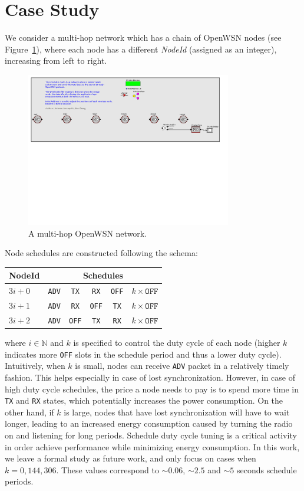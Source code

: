 \section{Case Study}
\label{sec:case-study}

We consider a multi-hop network which has a chain of OpenWSN nodes (see Figure~\ref{fig:multihop}), where each node has a different {\em NodeId} (assigned as an integer), increasing from left to right. 
\begin{figure}[t]
\centering
\includegraphics[width=0.8\textwidth]{figures/PaperDemoPtolemy}
\caption{\small A multi-hop OpenWSN network.}
\label{fig:multihop}
\end{figure}
Node schedules are constructed following the schema:

\begin{tabular}{ l | c | c | c | c | c }
  \hline                       
  NodeId & \multicolumn{5}{c}{Schedules} \\
  \hline
  $3i+0$ & \texttt{ADV} & \texttt{TX} & \texttt{RX} & \texttt{OFF} & $k \times \texttt{OFF}$ \\
  $3i+1$ & \texttt{ADV} & \texttt{RX} & \texttt{OFF} & \texttt{TX} & $k \times \texttt{OFF}$ \\
  $3i+2$ & \texttt{ADV} & \texttt{OFF} & \texttt{TX} & \texttt{RX} & $k \times \texttt{OFF}$ \\
  \hline  
\end{tabular}
where $i \in \mathbb{N}$ and $k$ is specified to control the duty cycle of each node (higher $k$ indicates more \texttt{OFF} slots in the schedule period and thus a lower duty cycle). Intuitively, when $k$ is small, nodes can receive \texttt{ADV} packet in a relatively timely fashion. This helps especially in case of lost synchronization. However, in case of high duty cycle schedules, the price a node needs to pay is to spend more time in \texttt{TX} and \texttt{RX} states, which potentially increases the power consumption. On the other hand, if $k$ is large, nodes that have lost synchronization will have to wait longer, leading to an increased energy consumption caused by turning the radio on and listening for long periods. Schedule duty cycle tuning is a critical activity in order achieve performance while minimizing energy consumption. In this work, we leave a formal study as future work, and only focus on cases when $k = 0, 144, 306$. These values correspond to $\sim0.06$, $\sim2.5$ and $\sim5$ seconds schedule periods. 

